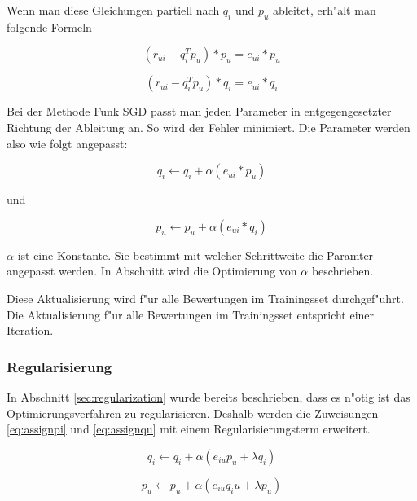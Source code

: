 \documentclass[a4paper, 12pt]{article}
\begin{document}
Wenn man diese Gleichungen partiell nach $q_i$ und $p_u$ ableitet, erh"alt man folgende Formeln

\begin{equation}
  \label{eq:devqi}
  (r_{ui} - q_i^T p_u) * p_u =  e_{ui} * p_u
\end{equation}

\begin{equation}
  \label{eq:devpu}
    (r_{ui} - q_i^T p_u) * q_i =  e_{ui} * q_i
\end{equation}

Bei der Methode Funk SGD passt man jeden Parameter in entgegengesetzter Richtung der Ableitung an. So wird der Fehler minimiert. Die Parameter werden also wie folgt angepasst:

\begin{equation}
  \label{eq:assignpi}
 q_i \leftarrow q_i + \alpha (e_{ui} * p_u)
\end{equation}

und

\begin{equation}
  \label{eq:assignqu}
 p_u \leftarrow p_u + \alpha (e_{ui} * q_i)
\end{equation}

$\alpha$ ist eine Konstante. Sie bestimmt mit welcher Schrittweite die Paramter angepasst werden. In Abschnitt \label{sec:results} wird die Optimierung von $\alpha$ beschrieben.

Diese Aktualisierung wird f"ur alle Bewertungen im Trainingsset durchgef"uhrt. Die Aktualisierung f"ur alle Bewertungen im Trainingsset entspricht einer Iteration.

\subsubsection{Regularisierung}
\label{sec:regularization2}

In Abschnitt \ref{sec:regularization} wurde bereits beschrieben, dass es n"otig ist das Optimierungsverfahren zu regularisieren. Deshalb werden die Zuweisungen \ref{eq:assignpi} und \ref{eq:assignqu} mit einem Regularisierungsterm erweitert.

\begin{equation}
  \label{eq:assign2}
  q_i \leftarrow q_i + \alpha (e_{iu} p_u + \lambda q_i)
\end{equation}

\begin{equation}
  \label{eq:assign3}
    p_u \leftarrow p_u + \alpha (e_{iu} q_iu + \lambda p_u)
\end{equation}
\end{document}
